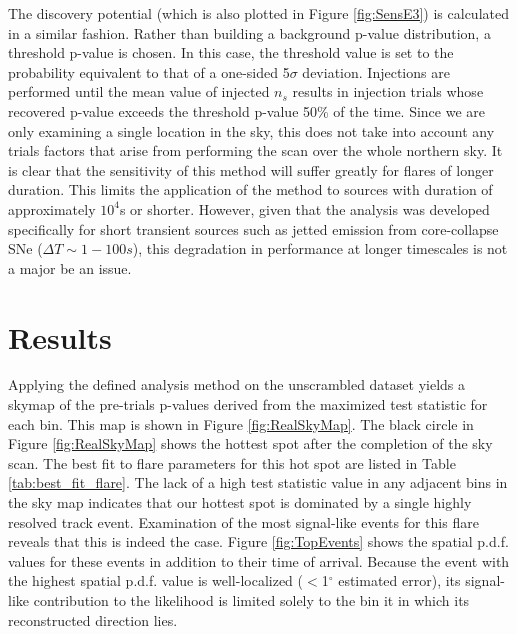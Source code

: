 \documentclass{gatech-thesis}
\begin{document}
The discovery potential (which is also plotted in Figure \ref{fig:SensE3}) is calculated in a similar fashion. Rather than building a background p-value distribution, a threshold p-value is chosen. In this case, the threshold value is set to the probability equivalent to that of a one-sided 5$\sigma$ deviation. Injections are performed until the mean value of injected $n_s$ results in injection trials whose recovered p-value exceeds the threshold p-value 50\% of the time. Since we are only examining a single location in the sky, this does not take into account any trials factors that arise from performing the scan over the whole northern sky. It is clear that the sensitivity of this method will suffer greatly for flares of longer duration. This limits the application of the method to sources with duration of approximately $10^4$s or shorter. However, given that the analysis was developed specifically for short transient sources such as jetted emission from core-collapse SNe ($\Delta T \sim 1-100s$), this degradation in performance at longer timescales is not a major be an issue.

\chapter{Results}
Applying the defined analysis method on the unscrambled dataset yields a skymap of the pre-trials p-values derived from the maximized test statistic for each bin. This map is shown in Figure \ref{fig:RealSkyMap}. The black circle in Figure \ref{fig:RealSkyMap} shows the hottest spot after the completion of the sky scan. The best fit to flare parameters for this hot spot are listed in Table \ref{tab:best_fit_flare}. The lack of a high test statistic value in any adjacent bins in the sky map indicates that our hottest spot is dominated by a single highly resolved track event. Examination of the most signal-like events for this flare reveals that this is indeed the case. Figure \ref{fig:TopEvents} shows the spatial p.d.f. values for these events in addition to their time of arrival. Because the event with the highest spatial p.d.f. value is well-localized ($<$1$^{\circ}$ estimated error), its signal-like contribution to the likelihood is limited solely to the bin it in which its reconstructed direction lies.
\end{document}
